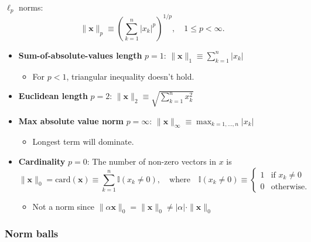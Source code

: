 \documentclass{article}
\begin{document}
        \begin{example}
            $\ell_p$ norms:
            \[
            \| \mathbf{x} \|_p \equiv \left( \sum_{k=1}^{n} |x_k|^p \right)^{1/p}, \quad 1 \leq p < \infty.
            \]
            \begin{itemize}
                \item \textbf{Sum-of-absolute-values length} $p=1$: $\| \mathbf{x} \|_1 \equiv \sum_{k=1}^{n} |x_k|$
                \begin{itemize}
                    \item For $p<1$, triangular inequality doesn't hold.
                \end{itemize}
                \item \textbf{Euclidean length} $p=2$: $\| \mathbf{x} \|_2 \equiv \sqrt{\sum_{k=1}^{n} x_k^2}$
                \item \textbf{Max absolute value norm} $p=\infty$: $\| \mathbf{x} \|_\infty \equiv \max_{k=1,\ldots,n} |x_k|$
                \begin{itemize}
                    \item Longest term will dominate.
                \end{itemize}
                \item \textbf{Cardinality} $p=0$: The number of non-zero vectors in $x$ is 
                        \[
                            \| \mathbf{x} \|_0 = \text{card}(\mathbf{x}) \equiv \sum_{k=1}^{n} \mathbb{I}(x_k \neq 0), \quad \text{where} \quad \mathbb{I}(x_k \neq 0) \equiv 
                        \begin{cases}
                        1 & \text{if } x_k \neq 0 \\
                        0 & \text{otherwise}.
                        \end{cases}
                        \]
                \begin{itemize}
                    \item Not a norm since $ \|\alpha \mathbf{x}\|_0 = \|\mathbf{x}\|_0 \neq |\alpha| \cdot \|\mathbf{x}\|_0$
                \end{itemize}
            \end{itemize}
        \end{example}

        \subsubsection{Norm balls}
        
\end{document}

